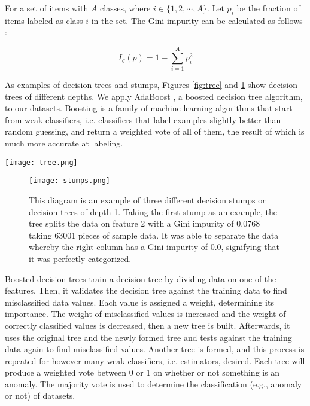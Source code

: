 \documentclass[5p]{elsarticle}
\begin{document}
For a set of items with $A$ classes, where $i \in \{ 1, 2, \cdots , A \} $. Let $p_i$ be the fraction of items labeled as class $i$ in the set. The Gini impurity can be calculated as follows \cite{devet}:

\begin{equation} I_g(p)=1-\sum_{i=1}^{A}p_i^2 
\end{equation}

As examples of decision trees and stumps, Figures \ref{fig:tree} and \ref{fig:stumps} show decision trees of different depths.	
We apply AdaBoost \cite{deset}, a boosted decision tree algorithm, to our datasets. Boosting is a family of machine learning algorithms that start from weak classifiers, i.e. classifiers that label examples slightly better than random guessing, and return a weighted vote of all of them, the result of which is much more accurate at labeling.

\begin{figure*}[htbp]
    \centering
    \texttt{[image: tree.png]}
    \caption{This diagram is an example of a decision tree of depth 6.}
    \label{fig:tree}
\end{figure*}

\begin{figure}[htbp]
    \centering
    \texttt{[image: stumps.png]}
    \caption{This diagram is an example of three different decision stumps or decision trees of depth 1. Taking the first stump as an example, the tree splits the data on feature 2 with a Gini impurity of 0.0768 taking 63001 pieces of sample data. It was able to separate the data whereby the right column has a Gini impurity of 0.0, signifying that it was perfectly categorized.}
    \label{fig:stumps}
\end{figure}

Boosted decision trees train a decision tree by dividing data on one of the features. Then, it validates the decision tree against the training data to find misclassified data values. Each value is assigned a weight, determining its importance. The weight of misclassified values is increased and the weight of correctly classified values is decreased, then a new tree is built. Afterwards, it uses the original tree and the newly formed tree and tests against the training data again to find misclassified values. Another tree is formed, and this process is repeated for however many weak classifiers, i.e. estimators, desired. Each tree will produce a weighted vote between 0 or 1 on whether or not something is an anomaly. The majority vote is used to determine the classification (e.g., anomaly or not) of datasets.
\end{document}
